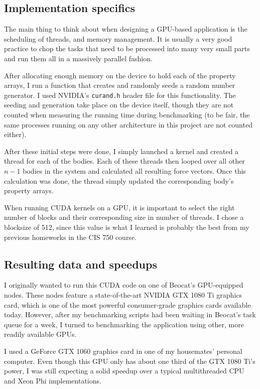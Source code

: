 \documentclass[journal]{IEEEtran}
\begin{document}
		\subsection*{Implementation specifics}
		
			The main thing to think about when designing a GPU-based application is the scheduling of threads, and memory management. It is usually a very good practice to chop the tasks that need to be processed into many very small parts and run them all in a massively parallel fashion.
			
			After allocating enough memory on the device to hold each of the property arrays, I run a function that creates and randomly seeds a random number generator. I used NVIDIA's \texttt{curand.h} header file for this functionality. The seeding and generation take place on the device itself, though they are not counted when measuring the running time during benchmarking (to be fair, the same processes running on any other architecture in this project are not counted either).
			
			After these initial steps were done, I simply launched a kernel and created a thread for each of the bodies. Each of these threads then looped over all other $n-1$ bodies in the system and calculated all resulting force vectors. Once this calculation was done, the thread simply updated the corresponding body's property arrays.
			
			When running CUDA kernels on a GPU, it is important to select the right number of blocks and their corresponding size in number of threads. I chose a blocksize of 512, since this value is what I learned is probably the best from my previous homeworks in the CIS 750 course.
			
		\subsection*{Resulting data and speedups}
			
			I originally wanted to run this CUDA code on one of Beocat's GPU-equipped nodes. These nodes feature a state-of-the-art NVIDIA GTX 1080 Ti graphics card, which is one of the most powerful consumer-grade graphics cards available today. However, after my benchmarking scripts had been waiting in Beocat's task queue for a week, I turned to benchmarking the application using other, more readily available GPUs.
			
			I used a GeForce GTX 1060 graphics card in one of my housemates' personal computer. Even though this GPU only has about one third of the GTX 1080 Ti's power, I was still expecting a solid speedup over a typical multithreaded CPU and Xeon Phi implementations.
			
\end{document}
